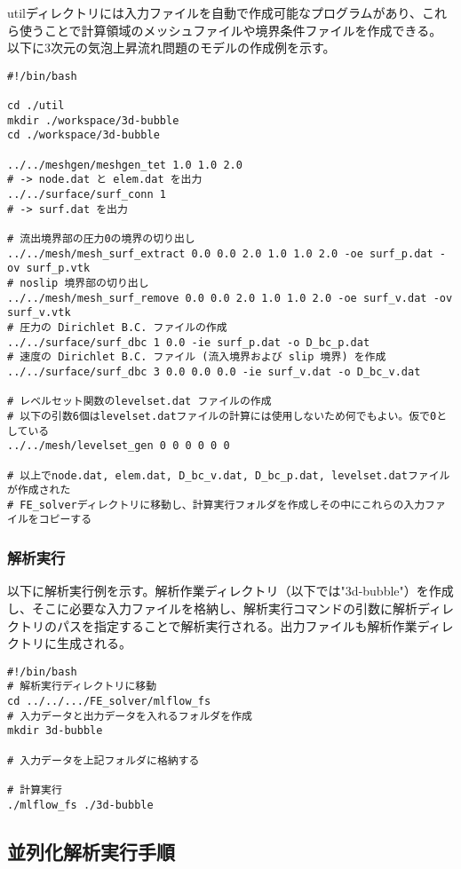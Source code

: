 utilディレクトリには入力ファイルを自動で作成可能なプログラムがあり、これら使うことで計算領域のメッシュファイルや境界条件ファイルを作成できる。
以下に3次元の気泡上昇流れ問題のモデルの作成例を示す。
\begin{lstlisting}[]
#!/bin/bash

cd ./util
mkdir ./workspace/3d-bubble
cd ./workspace/3d-bubble

../../meshgen/meshgen_tet 1.0 1.0 2.0
# -> node.dat と elem.dat を出力
../../surface/surf_conn 1
# -> surf.dat を出力

# 流出境界部の圧力0の境界の切り出し
../../mesh/mesh_surf_extract 0.0 0.0 2.0 1.0 1.0 2.0 -oe surf_p.dat -ov surf_p.vtk
# noslip 境界部の切り出し
../../mesh/mesh_surf_remove 0.0 0.0 2.0 1.0 1.0 2.0 -oe surf_v.dat -ov surf_v.vtk
# 圧力の Dirichlet B.C. ファイルの作成
../../surface/surf_dbc 1 0.0 -ie surf_p.dat -o D_bc_p.dat
# 速度の Dirichlet B.C. ファイル (流入境界および slip 境界) を作成
../../surface/surf_dbc 3 0.0 0.0 0.0 -ie surf_v.dat -o D_bc_v.dat

# レベルセット関数のlevelset.dat ファイルの作成
# 以下の引数6個はlevelset.datファイルの計算には使用しないため何でもよい。仮で0としている
../../mesh/levelset_gen 0 0 0 0 0 0

# 以上でnode.dat, elem.dat, D_bc_v.dat, D_bc_p.dat, levelset.datファイルが作成された
# FE_solverディレクトリに移動し、計算実行フォルダを作成しその中にこれらの入力ファイルをコピーする
\end{lstlisting}

\subsubsection{解析実行}

以下に解析実行例を示す。解析作業ディレクトリ（以下では"3d-bubble"）を作成し、そこに必要な入力ファイルを格納し、解析実行コマンドの引数に解析ディレクトリのパスを指定することで解析実行される。出力ファイルも解析作業ディレクトリに生成される。
\begin{lstlisting}[]
#!/bin/bash
# 解析実行ディレクトリに移動
cd ../../.../FE_solver/mlflow_fs
# 入力データと出力データを入れるフォルダを作成
mkdir 3d-bubble

# 入力データを上記フォルダに格納する

# 計算実行
./mlflow_fs ./3d-bubble
\end{lstlisting}

\subsection{並列化解析実行手順}

